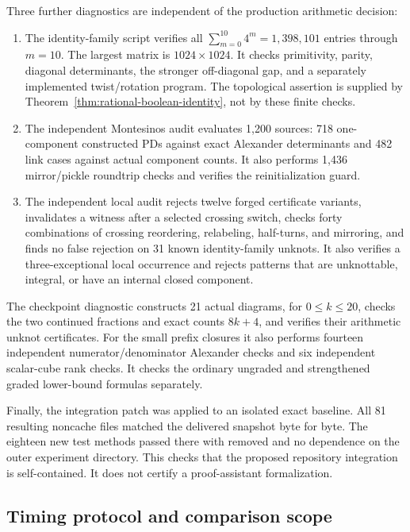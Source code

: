 \documentclass[11pt,a4paper]{article}
\theoremstyle{definition}
\theoremstyle{remark}
\newcommand{\code}[1]{\texttt{\detokenize{#1}}}
\numberwithin{equation}{section}
\begin{document}
Three further diagnostics are independent of the production arithmetic
decision:
\begin{enumerate}
\item The identity-family script verifies all
\(\sum_{m=0}^{10}4^m=1{,}398{,}101\) entries through \(m=10\).
The largest matrix is \(1024\times1024\). It checks primitivity, parity,
diagonal determinants, the stronger off-diagonal gap, and a separately
implemented twist/rotation program. The topological assertion is supplied
by Theorem~\ref{thm:rational-boolean-identity}, not by these finite checks.
\item The independent Montesinos audit evaluates 1,200 sources: 718
one-component constructed PDs against exact Alexander determinants and
482 link cases against actual component counts. It also performs 1,436
mirror/pickle roundtrip checks and verifies the reinitialization guard.
\item The independent local audit rejects twelve forged certificate
variants, invalidates a witness after a selected crossing switch,
checks forty combinations of crossing reordering, relabeling,
half-turns, and mirroring, and finds no false rejection on 31 known
identity-family unknots. It also verifies a three-exceptional local
occurrence and rejects patterns that are unknottable, integral, or have
an internal closed component.
\end{enumerate}

The checkpoint diagnostic constructs 21 actual diagrams, for \(0\le k\le20\),
checks the two continued fractions and exact counts \(8k+4\), and verifies
their arithmetic unknot certificates. For the small prefix closures it
also performs fourteen independent numerator/denominator Alexander checks
and six independent scalar-cube rank checks. It checks the ordinary
ungraded and strengthened graded lower-bound formulas separately.

Finally, the integration patch was applied to an isolated exact baseline.
All 81 resulting noncache files matched the delivered \code{fast}
snapshot byte for byte. The eighteen new test methods passed there with
\code{PYTHONPATH} removed and no dependence on the outer experiment
directory. This checks that the proposed repository integration is
self-contained. It does not certify a proof-assistant formalization.

\subsection{Timing protocol and comparison scope}
\end{document}
